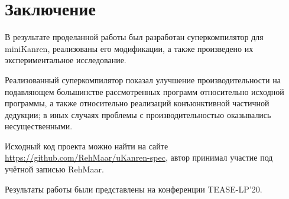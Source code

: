 \section*{Заключение}

В результате проделанной работы был разработан суперкомпилятор для miniKanren,
реализованы его модификации, а также произведено их экспериментальное исследование.

Реализованный суперкомпилятор показал улучшение производительности на подавляющем
большинстве рассмотренных программ относительно исходной программы, а также относительно
реализаций конъюнктивной частичной дедукции;
в иных случаях проблемы с производительностью оказывались несущественными.

Исходный код проекта можно найти на сайте \url{https://github.com/RehMaar/uKanren-spec},
автор принимал участие под учётной записью RehMaar.

Результаты работы были представлены на конференции TEASE-LP'20.

